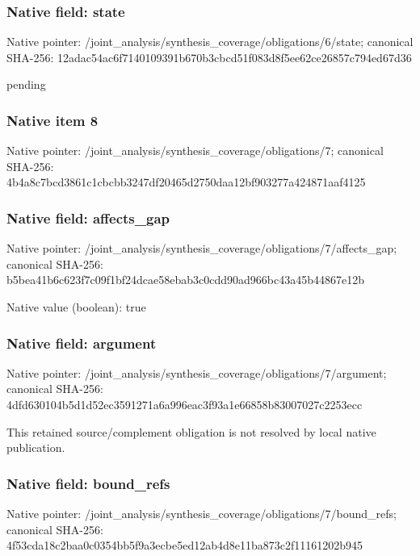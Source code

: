 \documentclass[10pt,a4paper]{article}
\begin{document}
\subsubsection{Native field: state}
Native pointer: /joint\_\allowbreak{}analysis/synthesis\_\allowbreak{}coverage/obligations/6/state; canonical SHA-256: 12adac54ac6f7140109391b670b3cbcd51f083d8f5ee62ce26857c794ed67d36

\begingroup\raggedright\sloppy pending\par\endgroup

\subsubsection{Native item 8}
Native pointer: /joint\_\allowbreak{}analysis/synthesis\_\allowbreak{}coverage/obligations/7; canonical SHA-256: 4b4a8c7bcd3861c1cbcbb3247df20465d2750daa12bf903277a424871aaf4125

\subsubsection{Native field: affects\_\allowbreak{}gap}
Native pointer: /joint\_\allowbreak{}analysis/synthesis\_\allowbreak{}coverage/obligations/7/affects\_\allowbreak{}gap; canonical SHA-256: b5bea41b6c623f7c09f1bf24dcae58ebab3c0cdd90ad966bc43a45b44867e12b

Native value (boolean): true

\subsubsection{Native field: argument}
Native pointer: /joint\_\allowbreak{}analysis/synthesis\_\allowbreak{}coverage/obligations/7/argument; canonical SHA-256: 4dfd630104b5d1d52ec3591271a6a996eac3f93a1e66858b83007027c2253ecc

\begingroup\raggedright\sloppy This retained source/\allowbreak{}complement obligation is not resolved by local native publication.\par\endgroup

\subsubsection{Native field: bound\_\allowbreak{}refs}
Native pointer: /joint\_\allowbreak{}analysis/synthesis\_\allowbreak{}coverage/obligations/7/bound\_\allowbreak{}refs; canonical SHA-256: 4f53cda18c2baa0c0354bb5f9a3ecbe5ed12ab4d8e11ba873c2f11161202b945
\end{document}
